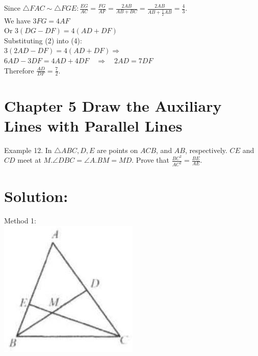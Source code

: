 \documentclass[10pt]{article}
\begin{document}
Since \(\triangle F A C \sim \triangle F G E: \frac{E G}{A C}=\frac{F G}{A F}=\frac{2 A B}{A B+B C}=\frac{2 A B}{A B+\frac{1}{2} A B}=\frac{4}{3}\).\\
We have \(3 F G=4 A F\)\\
Or \(3(D G-D F)=4(A D+D F)\)\\
Substituting (2) into (4):\\
\(3(2 A D-D F)=4(A D+D F) \Rightarrow\)\\
\(6 A D-3 D F=4 A D+4 D F \quad \Rightarrow \quad 2 A D=7 D F\)\\
Therefore \(\frac{A D}{D F}=\frac{7}{2}\).

\section*{Chapter 5 Draw the Auxiliary Lines with Parallel Lines}
Example 12. In \(\triangle A B C, D, E\) are points on \(A C B\), and \(A B\), respectively. \(C E\) and \(C D\) meet at \(M . \angle D B C=\angle A . B M=M D\). Prove that \(\frac{B C^{2}}{A C^{2}}=\frac{B E}{A E}\).

\section*{Solution:}
Method 1:\\
\includegraphics[max width=\textwidth, center]{2025_04_17_97bc1f7e44d93c271a88g-115}
\end{document}

